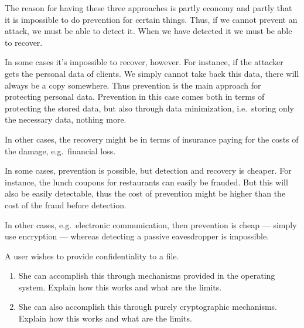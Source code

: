 \begin{frame}
  \begin{solution}
    The reason for having these three approaches is partly economy and partly 
    that it is impossible to do prevention for certain things.
    Thus, if we cannot prevent an attack, we must be able to detect it.
    When we have detected it we must be able to recover.

    In some cases it's impossible to recover, however.
    For instance, if the attacker gets the personal data of clients.
    We simply cannot take back this data, there will always be a copy somewhere.
    Thus prevention is the main approach for protecting personal data.
    Prevention in this case comes both in terms of protecting the stored data, 
    but also through data minimization, i.e.\ storing only the necessary data, 
    nothing more.

    In other cases, the recovery might be in terms of insurance paying for the 
    costs of the damage, e.g.\ financial loss.

    In some cases, prevention is possible, but detection and recovery is 
    cheaper.
    For instance, the lunch coupons for restaurants can easily be frauded.
    But this will also be easily detectable, thus the cost of prevention might 
    be higher than the cost of the fraud before detection.

    In other cases, e.g.\ electronic communication, then prevention is cheap --- 
    simply use encryption --- whereas detecting a passive eavesdropper is 
    impossible.
  \end{solution}
\end{frame}


\begin{frame}
  \begin{exercise}
    A user wishes to provide confidentiality to a file.
    \begin{enumerate}
      \item She can accomplish this through mechanisms provided in the operating 
        system.
        Explain how this works and what are the limits.

      \item She can also accomplish this through purely cryptographic mechanisms.
        Explain how this works and what are the limits.
    \end{enumerate}
  \end{exercise}
\end{frame}

